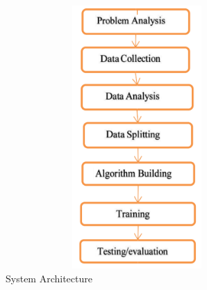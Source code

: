 \documentclass[12pt]{article}
\begin{document}
\begin{figure}[H]
\begin{center}
 \includegraphics[width=10cm, height=10cm]{L4P1}
\caption{System Architecture}
\end{center}
\end{figure}
\end{document}
